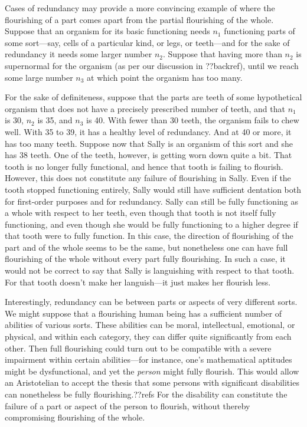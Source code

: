 Cases of redundancy may provide a more convincing example of where the flourishing of a part comes apart from
the partial flourishing of the whole. Suppose that an organism for its basic functioning needs $n_1$ functioning parts of some sort---say,
cells of a particular kind, or legs, or teeth---and for the sake of redundancy it needs some larger number $n_2$.
Suppose that having more than $n_2$ is supernormal for the organism (as per our discussion in ??backref), until we
reach some large number $n_3$ at which point the organism has too many.  

For the sake of definiteness, suppose that the parts are teeth of some hypothetical organism that does not
have a precisely prescribed number of teeth, and that $n_1$ is 30, $n_2$ is 35, and $n_3$ is 40. With fewer
than 30 teeth, the organism fails to chew well. With 35 to 39, it has a healthy level of redundancy. And at 40 or more,
it has too many teeth. Suppose now that Sally is an organism of this sort and she has 38 teeth. One of the teeth, however,
is getting worn down quite a bit. That tooth is no longer fully functional, and hence that tooth is failing to flourish.
However, this does not constitute any failure of flourishing in Sally. Even if the tooth stopped functioning entirely,
Sally would still have sufficient dentation both for first-order purposes and for redundancy. Sally can still be fully
functioning as a whole with respect to her teeth, even though that tooth is not itself fully functioning, and even though
she would be fully functioning to a higher degree if that tooth were to fully function. In this case, the direction of
flourishing of the part and of the whole seems to be the same, but nonetheless one can have full flourishing of the whole
without every part fully flourishing. In such a case, it would not be correct to say that Sally is languishing with respect
to that tooth. For that tooth doesn't make her languish---it just makes her flourish less.

Interestingly, redundancy can be between parts or aspects of very different sorts. We might suppose that a flourishing human 
being has a sufficient number of abilities of various sorts. These abilities can be moral, intellectual, emotional, or physical, and
within each category, they can differ quite significantly from each other. Then full flourishing could turn out to be compatible with a severe
impairment within certain abilities---for instance, one's mathematical aptitudes might be dysfunctional, and yet the \textit{person} 
might fully flourish. This would allow an Aristotelian to accept the thesis that some persons with significant disabilities can nonetheless
be fully flourishing.??refs For the disability can constitute the failure of a part or aspect of the person to flourish, without
thereby compromising flourishing of the whole. 

